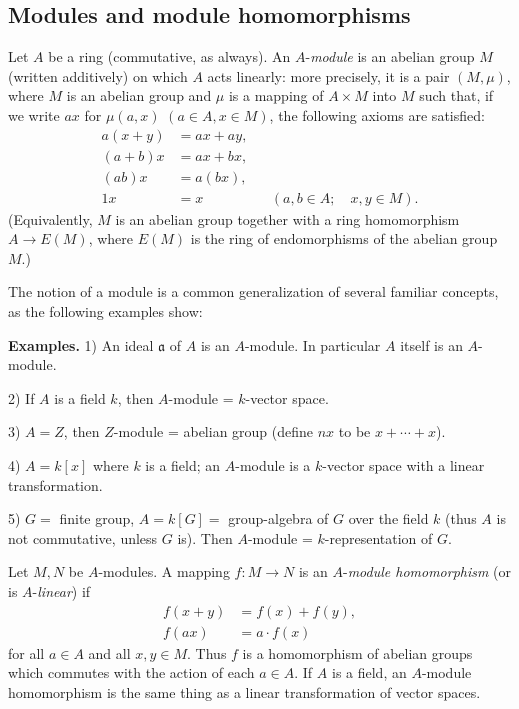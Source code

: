 \subsection{Modules and module homomorphisms}

Let \(A\) be a ring (commutative, as always). An \(A\)-\emph{module} is an abelian group \(M\) (written additively) on which \(A\) acts linearly: more precisely, it is a pair \((M,\mu)\), where \(M\) is an abelian group and \(\mu\) is a mapping of \(A\times M\) into \(M\) such that, if we write \(ax\) for \(\mu(a,x)\) \((a\in A,x\in M)\), the following axioms are satisfied:
\[
\begin{aligned}
a(x+y)&=ax+ay,\\
(a+b)x&=ax+bx,\\
(ab)x&=a(bx),\\
1x&=x &&(a,b\in A;\quad x,y\in M).
\end{aligned}
\]
(Equivalently, \(M\) is an abelian group together with a ring homomorphism \(A\to E(M)\), where \(E(M)\) is the ring of endomorphisms of the abelian group \(M\).)

The notion of a module is a common generalization of several familiar concepts, as the following examples show:

\noindent\textbf{Examples.} 1) An ideal \(\mathfrak a\) of \(A\) is an \(A\)-module. In particular \(A\) itself is an \(A\)-module.

2) If \(A\) is a field \(k\), then \(A\)-module = \(k\)-vector space.

3) \(A=Z\), then \(Z\)-module = abelian group (define \(nx\) to be \(x+\cdots+x\)).

4) \(A=k[x]\) where \(k\) is a field; an \(A\)-module is a \(k\)-vector space with a linear transformation.

5) \(G={}\) finite group, \(A=k[G]={}\) group-algebra of \(G\) over the field \(k\) (thus \(A\) is not commutative, unless \(G\) is). Then \(A\)-module = \(k\)-representation of \(G\).

Let \(M,N\) be \(A\)-modules. A mapping \(f:M\to N\) is an \(A\)-\emph{module homomorphism} (or is \(A\)-\emph{linear}) if
\[
\begin{aligned}
f(x+y)&=f(x)+f(y),\\
f(ax)&=a\cdot f(x)
\end{aligned}
\]
for all \(a\in A\) and all \(x,y\in M\). Thus \(f\) is a homomorphism of abelian groups which commutes with the action of each \(a\in A\). If \(A\) is a field, an \(A\)-module homomorphism is the same thing as a linear transformation of vector spaces.

